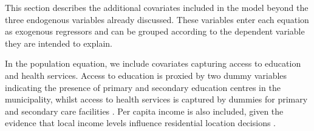 \documentclass[a4paper,11pt,oneside]{article}
\begin{document}







This section describes the additional covariates included in the model beyond the three endogenous variables already discussed. These variables enter each equation as exogenous regressors and can be grouped according to the dependent variable they are intended to explain.

In the population equation, we include covariates capturing access to education and health services. Access to education is proxied by two dummy variables indicating the presence of primary and secondary education centres in the municipality, whilst access to health services is captured by dummies for primary and secondary care facilities \citep[see][]{kompil2019mapping,goerlich2021distribucion}. Per capita income is also included, given the evidence that local income levels influence residential location decisions \citep[see][]{carlino1987determinants,hoogstra2017jobs,bandres2021despoblacion}.
\end{document}
